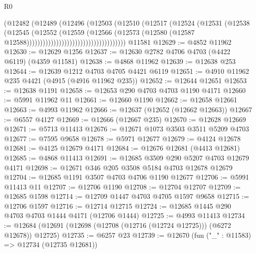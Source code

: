 \begin{lexlean}{R0}
\begin{coremodule}
                                              (@12482
                                                (@12489
                                                  (@12496
                                                    (@12503
                                                      (@12510
                                                        (@12517
                                                          (@12524
                                                            (@12531
                                                              (@12538
                                                                (@12545
                                                                  (@12552
                                                                    (@12559
                                                                      (@12566
                                                                        (@12573
                                                                          (@12580
                                                                            (@12587
                                                                              @12588)))))))))))))))))))))))))))))))))))))
    @11581
@12629 := @4852 @11962
@12630 := @12629 @1256
@12637 := @12630 @2782 @4706 @4703 (@4422 @6119) (@4359 @11581)
@12638 := @4868 @11962
@12639 := @12638 @253
@12644 := @12639 @1212 @4703 @4705 @4421 @6119
@12651 := @4910 @11962 @235 @4421 (@4915 (@4916 @11962 @235))
@12652 := @12644 @12651
@12653 := @12638 @1191
@12658 := @12653 @290 @4703 @4703 @1190 @4171
@12660 := @5991 @11962 @11
@12661 := @12660 @1190
@12662 := @12658 @12661
@12663 := @4993 @11962
@12666 := @12637 (@12652 (@12662 @12663))
@12667 := @6557 @4127
@12669 := @12666 (@12667 @235)
@12670 := @12628 @12669
@12671 := @5713 @11413
@12676 := @12671 @1073 @3503 @3511 @5209 @4703
@12677 := @7595 @9658
@12678 := @5971 @12677
@12679 := @4124 @12678
@12681 := @4125 @12679 @4171
@12684 := @12676 @12681 (@4413 @12681)
@12685 := @4868 @11413
@12691 := @12685 @3509 @290 @5207 @4703 @12679 @4171
@12698 := @12671 @346 @205 @3508 @5184 @4703 @12678 @12679
@12704 := @12685 @1191 @3507 @4703 @4706 @1190 @12677
@12706 := @5991 @11413 @11
@12707 := @12706 @1190
@12708 := @12704 @12707
@12709 := @12685 @1598
@12714 := @12709 @1447 @4703 @4705 @1597 @9658
@12715 := @12706 @1597
@12716 := @12714 @12715
@12724 := @12685 @1445 @290 @4703 @4703 @1444 @4171 (@12706 @1444)
@12725 := @4993 @11413
@12734 := @12684 (@12691 (@12698 (@12708 (@12716 (@12724 @12725))) (@6272 @12678)) @12725)
@12735 := @6257 @23
@12739 := @12670 (fun ("_" : @11583) => @12734 (@12735 @12681))

\end{coremodule}
\end{lexlean}
